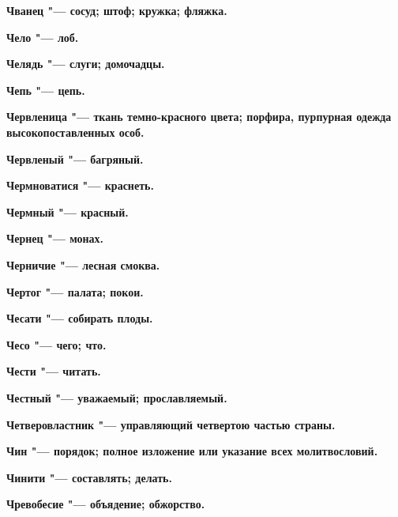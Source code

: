 \bfseries Чванец \normalfont{} "--- сосуд; штоф; кружка; фляжка. 




\bfseries Чело \normalfont{} "--- лоб. 




\bfseries Челядь \normalfont{} "--- слуги; домочадцы. 




\bfseries Чепь \normalfont{} "--- цепь. 




\bfseries Червленица \normalfont{} "--- ткань темно-красного цвета; порфира, пурпурная одежда высокопоставленных особ. 




\bfseries Червленый \normalfont{} "--- багряный. 




\bfseries Чермноватися \normalfont{} "--- краснеть. 




\bfseries Чермный \normalfont{} "--- красный. 




\bfseries Чернец \normalfont{} "--- монах. 




\bfseries Черничие \normalfont{} "--- лесная смоква. 




\bfseries Чертог \normalfont{} "--- палата; покои. 




\bfseries Чесати \normalfont{} "--- собирать плоды. 




\bfseries Чесо \normalfont{} "--- чего; что. 




\bfseries Чести \normalfont{} "--- читать. 




\bfseries Честный \normalfont{} "--- уважаемый; прославляемый. 




\bfseries Четверовластник \normalfont{} "--- управляющий четвертою частью страны. 




\bfseries Чин \normalfont{} "--- порядок; полное изложение или указание всех молитвословий. 




\bfseries Чинити \normalfont{} "--- составлять; делать. 




\bfseries Чревобесие \normalfont{} "--- объядение; обжорство. 




